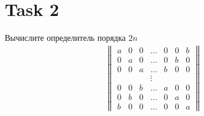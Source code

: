 \section{Task 2}
\begin{task}
    Вычислите определитель порядка $2n$
    \begin{eqnarray}
        \begin{Vmatrix}
            a & 0 & 0 & \ldots & 0 & 0 & b \\
            0 & a & 0 & \ldots & 0 & b & 0 \\
            0 & 0 & a & \ldots & b & 0 & 0 \\
              &   &   & \vdots &   &   &   \\
            0 & 0 & b & \ldots & a & 0 & 0 \\
            0 & b & 0 & \ldots & 0 & a & 0 \\
            b & 0 & 0 & \ldots & 0 & 0 & a
        \end{Vmatrix}
    \end{eqnarray}
\end{task}

